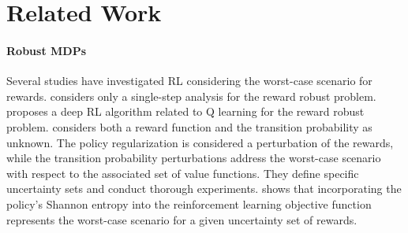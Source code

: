\section{Related Work}
\paragraph{Robust MDPs}
Several studies have investigated RL considering the worst-case scenario for rewards. \cite{ortega2014adversarial} considers only a single-step analysis for the reward robust problem. \cite{husain2021regularized} proposes a deep RL algorithm related to Q learning for the reward robust problem. \cite{NEURIPS2021_bb1443cc} considers both a reward function and the transition probability as unknown. The policy regularization is considered a perturbation of the rewards, while the transition probability perturbations address the worst-case scenario with respect to the associated set of value functions. They define specific uncertainty sets and conduct thorough experiments. \cite{eysenbach2022maximum} shows that incorporating the policy's Shannon entropy into the reinforcement learning objective function represents the worst-case scenario for a given uncertainty set of rewards.



